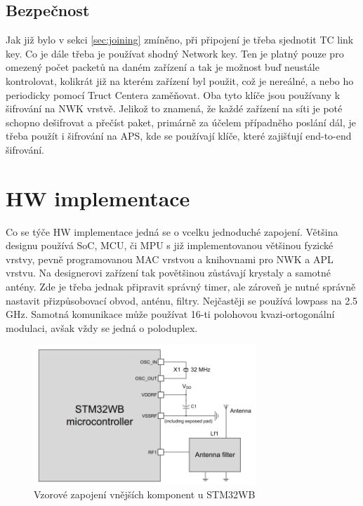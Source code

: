 \documentclass[a4paper,10pt,titlepage]{article}
\begin{document}
\subsection{Bezpečnost} \label{sec:security}
Jak již bylo v sekci \ref{sec:joining} zmíněno, při připojení je třeba sjednotit TC link key. Co je dále třeba je používat shodný Network key. Ten je platný pouze pro omezený počet packetů na daném zařízení a tak je možnost buď neustále kontrolovat, kolikrát již na kterém zařízení byl použit, což je nereálné, a nebo ho periodicky pomocí Truct Centera zaměňovat. Oba tyto klíče jsou používany k šifrování na NWK vrstvě. Jelikož to znamená, že každé zařízení na síti je poté schopno dešifrovat a přečíst paket, primárně za účelem případněho poslání dál, je třeba použít i šifrování na APS, kde se používají klíče, které zajišťují end-to-end šifrování.

\section{HW implementace} \label{sec:hw}
Co se týče HW implementace jedná se o vcelku jednoduché zapojení. Většina designu používá SoC, MCU, či MPU s již implementovanou většinou fyzické vrstvy, pevně programovanou MAC vrstvou a knihovnami pro NWK a APL vrstvu. Na designerovi zařízení tak povětšinou zůstávají krystaly a samotné antény. Zde je třeba jednak připravit správný timer, ale zároveň je nutné správně nastavit přizpůsobovací obvod, anténu, filtry. Nejčastěji se používá lowpass na 2.5 GHz. Samotná komunikace může používat 16-ti polohovou kvazi-ortogonální modulaci, avšak vždy se jedná o poloduplex.

\begin{figure}[h] \label{fig:rf-ext}
	\centering
	\includegraphics[width=0.75\textwidth]{assets/rf_external.png}
	\caption[Vzorové zapojení vnějších komponent u STM32WB]{Vzorové zapojení vnějších komponent u STM32WB~\cite{stm32wb}}
\end{figure}
\end{document}
